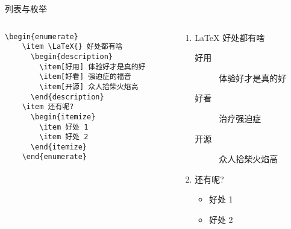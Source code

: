    
    \begin{frame}[fragile]{列表与枚举}
    \begin{columns}
    \begin{column}{.6\textwidth}
    \begin{lstlisting}[basicstyle=\ttfamily\small]
    \begin{enumerate}
    \item \LaTeX{} 好处都有啥
      \begin{description}
        \item[好用] 体验好才是真的好
        \item[好看] 强迫症的福音
        \item[开源] 众人拾柴火焰高
      \end{description}
    \item 还有呢?
      \begin{itemize}
        \item 好处 1
        \item 好处 2
      \end{itemize}
    \end{enumerate}
    \end{lstlisting}
    \end{column}
    \begin{column}{.4\textwidth}
    {\small
    \begin{enumerate}
    \item \LaTeX{} 好处都有啥
      \begin{description}
        \item[好用] 体验好才是真的好
        \item[好看] 治疗强迫症
        \item[开源] 众人拾柴火焰高
      \end{description}
    \item 还有呢?
      \begin{itemize}
        \item 好处 1
        \item 好处 2
      \end{itemize}
    \end{enumerate}
    }
    \end{column}
    \end{columns}
    
    \end{frame}
    
